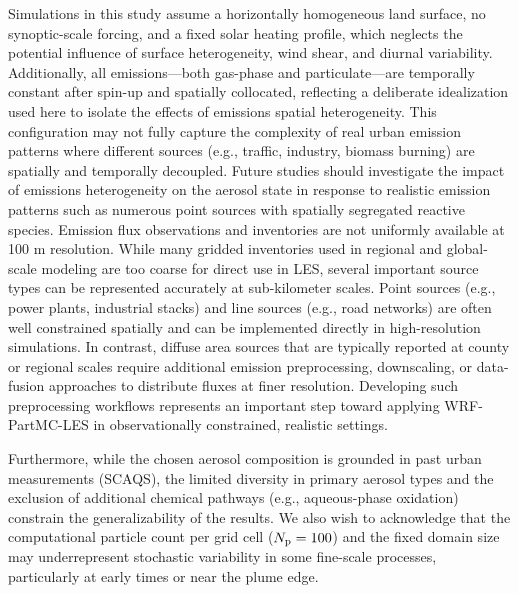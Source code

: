 \documentclass[acp, manuscript]{copernicus}
\begin{document}
Simulations in this study assume a horizontally homogeneous land
surface, no synoptic-scale forcing, and a fixed solar heating profile,
which neglects the potential influence of surface heterogeneity, wind
shear, and diurnal variability. Additionally, all emissions—both
gas-phase and particulate—are temporally constant after spin-up and
spatially collocated, reflecting a deliberate idealization used here
to isolate the effects of emissions spatial heterogeneity.  This
configuration may not fully capture the complexity of real urban
emission patterns where different sources (e.g., traffic, industry,
biomass burning) are spatially and temporally decoupled. Future
studies should investigate the impact of emissions heterogeneity on
the aerosol state in response to realistic emission patterns such as
numerous point sources with spatially segregated reactive
species. Emission flux observations and inventories are not uniformly available at 100 m resolution. While many gridded inventories used in regional and global-scale modeling are too coarse for direct use in LES, several important source types can be represented accurately at sub-kilometer scales. Point sources (e.g., power plants, industrial stacks) and line sources (e.g., road networks) are often well constrained spatially and can be implemented directly in high-resolution simulations. In contrast, diffuse area sources that are typically reported at county or regional scales require additional emission preprocessing, downscaling, or data-fusion approaches to distribute fluxes at finer resolution. Developing such preprocessing workflows represents an important step toward applying WRF-PartMC-LES in observationally constrained, realistic settings.



Furthermore, while the chosen aerosol composition is
grounded in past urban measurements (SCAQS), the limited diversity
in primary aerosol types and the exclusion of additional chemical
pathways (e.g., aqueous-phase oxidation) constrain the
generalizability of the results. We also wish to acknowledge that the computational particle
count per grid cell ($N_{\rm p} = 100$) and the fixed domain size
may underrepresent stochastic variability in some fine-scale
processes, particularly at early times or near the plume edge. 
\end{document}
